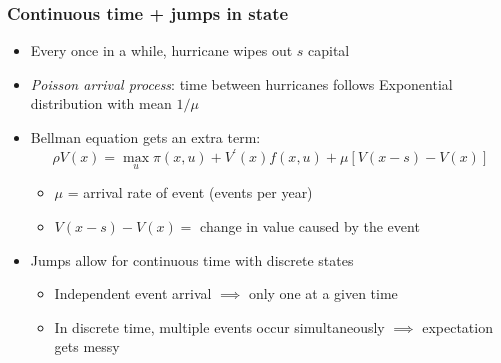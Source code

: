 \documentclass[bigger,handout]{beamer}
\begin{document}
\begin{frame}%
\frametitle{Continuous time + jumps in state}

\begin{itemize}
\item Every once in a while, hurricane wipes out $s$ capital

\item \emph{Poisson arrival process}: time between hurricanes follows
Exponential distribution with mean $1/\mu $

\item Bellman equation gets an extra term:%
\begin{equation*}
\rho V(x)=\max_{u}\pi \left( x,u\right) +V^{\prime }(x)f(x,u)+\mu \left[
V(x-s)-V(x)\right]
\end{equation*}

\begin{itemize}
\item $\mu $ = arrival rate of event (events per year)

\item $V(x-s)-V(x)=$ change in value caused by the event
\end{itemize}

\item Jumps allow for continuous time with discrete states

\begin{itemize}
\item Independent event arrival $\implies $ only one at a given time

\item In discrete time, multiple events occur simultaneously \newline
$\implies $ expectation gets messy
\end{itemize}
\end{itemize}


\end{frame}%
\end{document}
